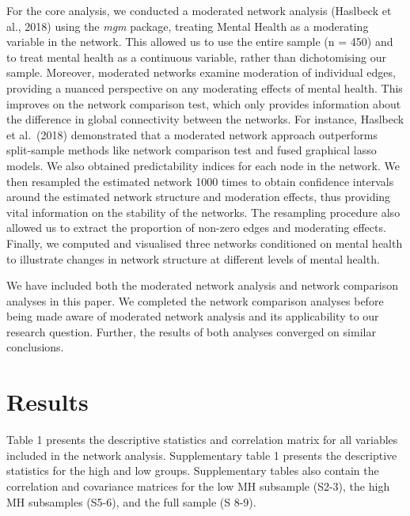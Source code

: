 \documentclass[
  english,
  man,floatsintext]{apa6}
\begin{document}
For the core analysis, we conducted a moderated network analysis (Haslbeck et al., 2018) using the \emph{mgm} package, treating Mental Health as a moderating variable in the network. This allowed us to use the entire sample (n = 450) and to treat mental health as a continuous variable, rather than dichotomising our sample. Moreover, moderated networks examine moderation of individual edges, providing a nuanced perspective on any moderating effects of mental health. This improves on the network comparison test, which only provides information about the difference in global connectivity between the networks. For instance, Haslbeck et al.~(2018) demonstrated that a moderated network approach outperforms split-sample methods like network comparison test and fused graphical lasso models. We also obtained predictability indices for each node in the network. We then resampled the estimated network 1000 times to obtain confidence intervals around the estimated network structure and moderation effects, thus providing vital information on the stability of the networks. The resampling procedure also allowed us to extract the proportion of non-zero edges and moderating effects. Finally, we computed and visualised three networks conditioned on mental health to illustrate changes in network structure at different levels of mental health.

We have included both the moderated network analysis and network comparison analyses in this paper. We completed the network comparison analyses before being made aware of moderated network analysis and its applicability to our research question. Further, the results of both analyses converged on similar conclusions.

\hypertarget{results}{%
\section{Results}\label{results}}

Table 1 presents the descriptive statistics and correlation matrix for all variables included in the network analysis. Supplementary table 1 presents the descriptive statistics for the high and low groups. Supplementary tables also contain the correlation and covariance matrices for the low MH subsample (S2-3), the high MH subsamples (S5-6), and the full sample (S 8-9).
\end{document}
